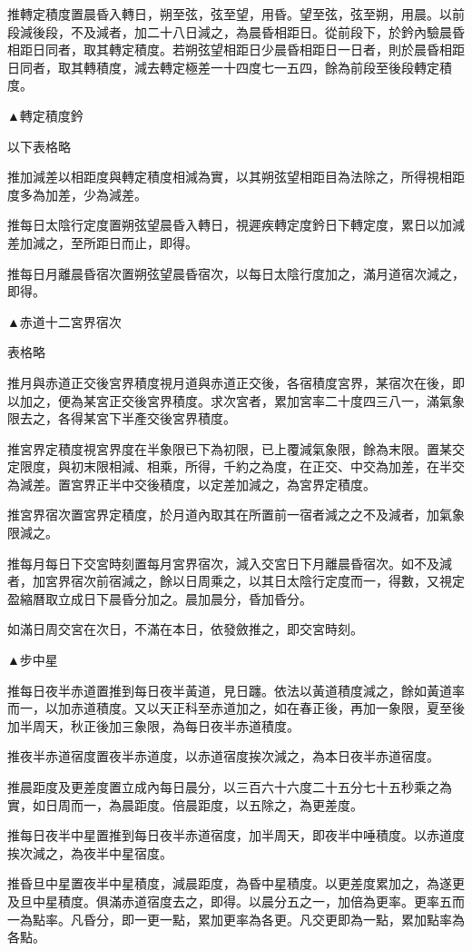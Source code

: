 推轉定積度置晨昏入轉日，朔至弦，弦至望，用昏。望至弦，弦至朔，用晨。以前段減後段，不及減者，加二十八日減之，為晨昏相距日。從前段下，於鈐內驗晨昏相距日同者，取其轉定積度。若朔弦望相距日少晨昏相距日一日者，則於晨昏相距日同者，取其轉積度，減去轉定極差一十四度七一五四，餘為前段至後段轉定積度。

▲轉定積度鈐

以下表格略

推加減差以相距度與轉定積度相減為實，以其朔弦望相距目為法除之，所得視相距度多為加差，少為減差。

推每日太陰行定度置朔弦望晨昏入轉日，視遲疾轉定度鈐日下轉定度，累日以加減差加減之，至所距日而止，即得。

推每日月離晨昏宿次置朔弦望晨昏宿次，以每日太陰行度加之，滿月道宿次減之，即得。

▲赤道十二宮界宿次

表格略

推月與赤道正交後宮界積度視月道與赤道正交後，各宿積度宮界，某宿次在後，即以加之，便為某宮正交後宮界積度。求次宮者，累加宮率二十度四三八一，滿氣象限去之，各得某宮下半產交後宮界積度。

推宮界定積度視宮界度在半象限已下為初限，已上覆減氣象限，餘為末限。置某交定限度，與初末限相減、相乘，所得，千約之為度，在正交、中交為加差，在半交為減差。置宮界正半中交後積度，以定差加減之，為宮界定積度。

推宮界宿次置宮界定積度，於月道內取其在所置前一宿者減之之不及減者，加氣象限減之。

推每月每日下交宮時刻置每月宮界宿次，減入交宮日下月離晨昏宿次。如不及減者，加宮界宿次前宿減之，餘以日周乘之，以其日太陰行定度而一，得數，又視定盈縮曆取立成日下晨昏分加之。晨加晨分，昏加昏分。

如滿日周交宮在次日，不滿在本日，依發斂推之，即交宮時刻。

▲步中星

推每日夜半赤道置推到每日夜半黃道，見日躔。依法以黃道積度減之，餘如黃道率而一，以加赤道積度。又以天正科至赤道加之，如在春正後，再加一象限，夏至後加半周天，秋正後加三象限，為每日夜半赤道積度。

推夜半赤道宿度置夜半赤道度，以赤道宿度挨次減之，為本日夜半赤道宿度。

推晨距度及更差度置立成內每日晨分，以三百六十六度二十五分七十五秒乘之為實，如日周而一，為晨距度。倍晨距度，以五除之，為更差度。

推每日夜半中星置推到每日夜半赤道宿度，加半周天，即夜半中唾積度。以赤道度挨次減之，為夜半中星宿度。

推昏旦中星置夜半中星積度，減晨距度，為昏中星積度。以更差度累加之，為遂更及旦中星積度。俱滿赤道宿度去之，即得。以晨分五之一，加倍為更率。更率五而一為點率。凡昏分，即一更一點，累加更率為各更。凡交更即為一點，累加點率為各點。

